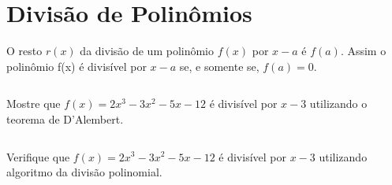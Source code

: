 \section{Divisão de Polinômios}

\begin{frame}
  \begin{theorem}
    O resto $r(x)$ da divisão de um polinômio $f(x)$ por $x-a$ é $f(a)$. Assim o polinômio f(x) é divisível por $x-a$ se, e somente se, $f(a)=0$.
  \end{theorem}
  \vspace{0.1cm}
  \begin{columns}[onlytextwidth]
    \begin{column}{0.7\textwidth}
      \begin{example-highlight}
        Mostre que $f(x)=2x^{3}-3x^{2}-5x-12$ é divisível por $x-3$ utilizando o teorema de D’Alembert. 
      \end{example-highlight}
    \end{column}
    \begin{column}{0.3\textwidth}
    \end{column}
  \end{columns}
\end{frame}

\begin{frame}
  \begin{example}
    Verifique que $f(x)=2x^{3}-3x^{2}-5x-12$ é divisível por $x-3$ utilizando algoritmo da divisão polinomial.
  \end{example}
\end{frame}
